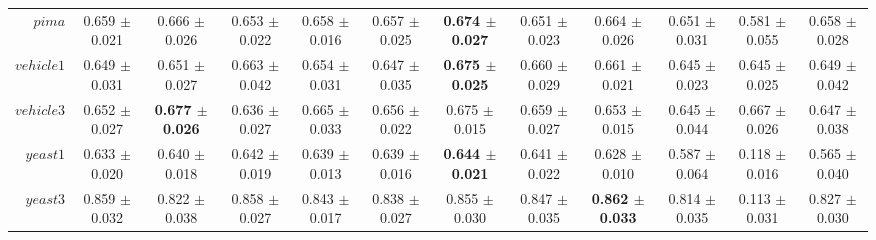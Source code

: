 \begin{table}[!ht]
{\begin{tabular}{r c c c c c c c c c c c}
$pima$ & 0.659 $\pm$ 0.021 & 0.666 $\pm$ 0.026 & 0.653 $\pm$ 0.022 & 0.658 $\pm$ 0.016 & 0.657 $\pm$ 0.025 & \textbf{0.674 $\pm$ 0.027} & 0.651 $\pm$ 0.023 & 0.664 $\pm$ 0.026 & 0.651 $\pm$ 0.031 & 0.581 $\pm$ 0.055 & 0.658 $\pm$ 0.028 \\
$vehicle1$ & 0.649 $\pm$ 0.031 & 0.651 $\pm$ 0.027 & 0.663 $\pm$ 0.042 & 0.654 $\pm$ 0.031 & 0.647 $\pm$ 0.035 & \textbf{0.675 $\pm$ 0.025} & 0.660 $\pm$ 0.029 & 0.661 $\pm$ 0.021 & 0.645 $\pm$ 0.023 & 0.645 $\pm$ 0.025 & 0.649 $\pm$ 0.042 \\
$vehicle3$ & 0.652 $\pm$ 0.027 & \textbf{0.677 $\pm$ 0.026} & 0.636 $\pm$ 0.027 & 0.665 $\pm$ 0.033 & 0.656 $\pm$ 0.022 & 0.675 $\pm$ 0.015 & 0.659 $\pm$ 0.027 & 0.653 $\pm$ 0.015 & 0.645 $\pm$ 0.044 & 0.667 $\pm$ 0.026 & 0.647 $\pm$ 0.038 \\
$yeast1$ & 0.633 $\pm$ 0.020 & 0.640 $\pm$ 0.018 & 0.642 $\pm$ 0.019 & 0.639 $\pm$ 0.013 & 0.639 $\pm$ 0.016 & \textbf{0.644 $\pm$ 0.021} & 0.641 $\pm$ 0.022 & 0.628 $\pm$ 0.010 & 0.587 $\pm$ 0.064 & 0.118 $\pm$ 0.016 & 0.565 $\pm$ 0.040 \\
$yeast3$ & 0.859 $\pm$ 0.032 & 0.822 $\pm$ 0.038 & 0.858 $\pm$ 0.027 & 0.843 $\pm$ 0.017 & 0.838 $\pm$ 0.027 & 0.855 $\pm$ 0.030 & 0.847 $\pm$ 0.035 & \textbf{0.862 $\pm$ 0.033} & 0.814 $\pm$ 0.035 & 0.113 $\pm$ 0.031 & 0.827 $\pm$ 0.030 \\
\end{tabular}}
\end{table}
